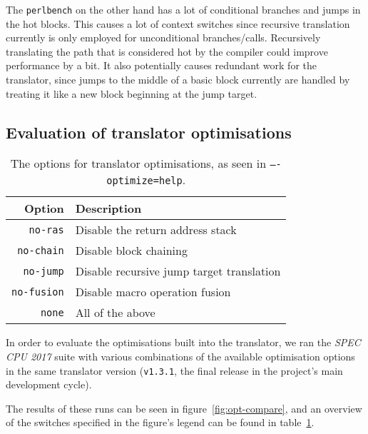 The \texttt{perlbench} on the other hand has a lot of conditional branches and jumps in the hot blocks.
This causes a lot of context switches since recursive translation currently is only employed for unconditional branches/calls.
Recursively translating the path that is considered hot by the compiler could improve performance by a bit.
It also potentially causes redundant work for the translator, since jumps to the middle of a basic block currently are handled by treating it like a new block beginning at the jump target.



\subsection{Evaluation of translator optimisations}
\begin{table}
	\centering
	\begin{tabular}{rl}
		\toprule
		\textbf{Option} & \textbf{Description}\\
		\midrule
		\texttt{no-ras} & Disable the return address stack\\
		\texttt{no-chain} & Disable block chaining\\
		\texttt{no-jump} & Disable recursive jump target translation\\
		\texttt{no-fusion} & Disable macro operation fusion\\
		\texttt{none} & All of the above\\
		\bottomrule
	\end{tabular}
	\caption[Translator optimisation options]%
	{The options for translator optimisations, as seen in \texttt{----optimize=help}.}
	\label{tab:opt-options}
\end{table}

In order to evaluate the optimisations built into the translator, we ran the \textit{SPEC CPU 2017} suite with various combinations of the available optimisation options in the same translator version (\texttt{v1.3.1}, the final release in the project's main development cycle).

The results of these runs can be seen in figure~\ref{fig:opt-compare}, and an overview of the switches specified in the figure's legend can be found in table~\ref{tab:opt-options}.



\basetable
{}\norastable
{}\nofusiontable
{}\nojumpnorastable
{}\nonetable

